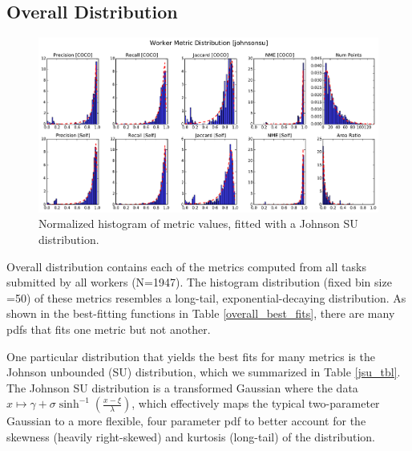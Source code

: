 \documentclass[12pt]{article}
\begin{document}
\subsection{Overall Distribution}
\begin{figure}[ht]
\centering
\includegraphics[width=\linewidth]{plots/johnsonsu_fitted_metric_histogram.pdf}
\caption{Normalized histogram of metric values, fitted with a Johnson SU distribution.}
\label{metric_hist}
\end{figure}
\par Overall distribution contains each of the metrics computed from all tasks submitted by all workers (N=1947). The histogram distribution (fixed bin size =50) of these metrics resembles a long-tail, exponential-decaying distribution. As shown in the best-fitting functions in Table \ref{overall_best_fits}, there are many pdfs that fits one metric but not another. 
\par One particular distribution that yields the best fits for many metrics is the Johnson unbounded (SU) distribution, which we summarized in Table \ref{jsu_tbl}. The Johnson SU distribution is a transformed Gaussian where the data $x\mapsto\gamma+\sigma \sinh^{-1}(\frac{x-\xi}{\lambda})$, which effectively maps the typical two-parameter Gaussian to a more flexible, four parameter pdf to better account for the skewness (heavily right-skewed) and kurtosis (long-tail) of the distribution.
\end{document}
